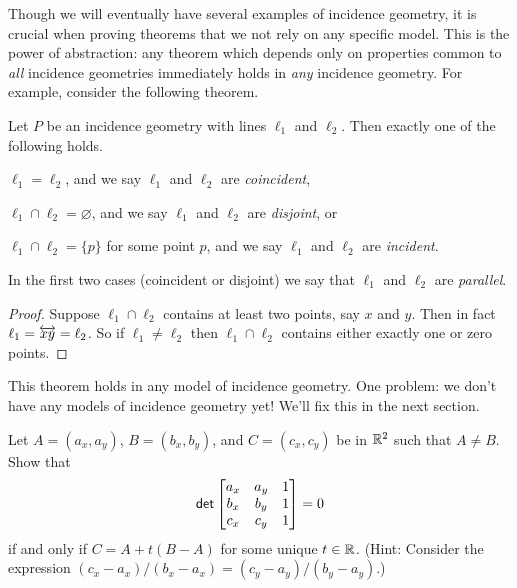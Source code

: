 Though we will eventually have several examples of incidence geometry, it is crucial when proving theorems that we not rely on any specific model.
This is the power of abstraction: any theorem which depends only on properties common to \emph{all} incidence geometries immediately holds in \emph{any} incidence geometry.
For example, consider the following theorem.

\begin{prop}
Let \(P\) be an incidence geometry with lines \(\ell_1\) and \(\ell_2\).
Then exactly one of the following holds.
\begin{proplist}
\item \(\ell_1 = \ell_2\), and we say \(\ell_1\) and \(\ell_2\) are \emph{coincident},
\item \(\ell_1 \cap \ell_2 = \varnothing\), and we say \(\ell_1\) and \(\ell_2\) are \emph{disjoint}, or
\item \(\ell_1 \cap \ell_2 = \{p\}\) for some point \(p\), and we say \(\ell_1\) and \(\ell_2\) are \emph{incident}.
\end{proplist}
In the first two cases (coincident or disjoint) we say that \(\ell_1\) and \(\ell_2\) are \emph{parallel}.
\end{prop}

\begin{proof}
Suppose \(\ell_1 \cap \ell_2\) contains at least two points, say \(x\) and \(y\).
Then in fact \(\ell_1 = \overleftrightarrow{xy} = \ell_2\).
So if \(\ell_1 \neq \ell_2\) then \(\ell_1 \cap \ell_2\) contains either exactly one or zero points.
\end{proof}

This theorem holds in any model of incidence geometry.
One problem: we don't have any models of incidence geometry yet!
We'll fix this in the next section.



\Exercises%

\begin{exercise}\label{exerc:rr2-collinear-comb}
Let \(A = (a_x, a_y)\), \(B = (b_x, b_y)\), and \(C = (c_x, c_y)\) be in \(\mathbb{R}^2\) such that \(A \neq B\).
Show that \[ \mathsf{det} \begin{bmatrix} a_x & a_y & 1 \\ b_x & b_y & 1 \\ c_x & c_y & 1 \end{bmatrix} = 0 \] if and only if \(C = A + t(B - A)\) for some unique \(t \in \mathbb{R}\).
(Hint: Consider the expression \( (c_x - a_x)/(b_x - a_x) = (c_y - a_y)/(b_y - a_y) \).)
\end{exercise}
